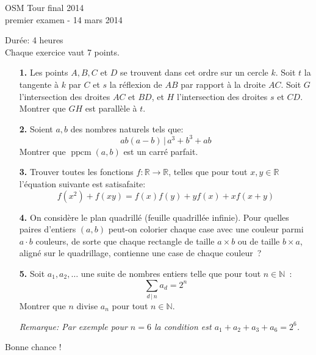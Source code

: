 \documentclass[11pt,a4paper]{article}
\theoremstyle{plain}
\theoremstyle{definition}
\DeclareMathOperator{\ppmc}{ppcm}
\renewcommand{\div}{\, | \,}
\newcommand{\R}{\mathbb{R}}
\newcommand{\N}{\mathbb{N}}
\begin{document}
\pagestyle{empty}

\begin{center}
{\huge OSM Tour final 2014} \\
\medskip premier examen - 14 mars 2014
\end{center}
\vspace{8mm}
Durée: 4 heures\\
Chaque exercice vaut 7 points.

\vspace{15mm}

\begin{enumerate}
\item[\textbf{1.}]
Les points $A, B, C$ et $D$ se trouvent dans cet ordre sur un cercle $k$. Soit $t$ la tangente à $k$ par $C$ et $s$ la réflexion de $AB$ par rapport à la droite $AC$. Soit $G$ l'intersection des droites $AC$ et $BD$, et $H$ l'intersection des droites $s$ et $CD$. Montrer que $GH$ est parallèle à $t$.


\bigskip

\item[\textbf{2.}]
Soient $a,b$ des nombres naturels tels que:
\[ab(a-b)\div a^3+b^3+ab\]
Montrer que $\ppmc(a,b)$ est un carré parfait.


\bigskip

\item[\textbf{3.}] 
Trouver toutes les fonctions $f:\R \rightarrow \R$, telles que pour tout $x,y \in \R$ l'équation suivante est satisafaite:
\[
f(x^2) + f(xy)=f(x)f(y)+yf(x)+xf(x+y)
\]

\bigskip

\item[\textbf{4.}]
On considère le plan quadrillé (feuille quadrillée infinie). Pour quelles paires d'entiers $(a,b)$ peut-on colorier chaque case avec une couleur parmi $a \cdot b$ couleurs, de sorte que chaque rectangle de taille $a \times b$ ou de taille $b \times a$, aligné sur le quadrillage, contienne une case de chaque couleur~?


\bigskip

\item[\textbf{5.}]
Soit $a_1, a_2, \ldots$ une suite de nombres entiers telle que pour tout $n\in\N$~:
 \[
\sum_{d\div n}a_d = 2^n
\]
Montrer que $n$ divise $a_n$ pour tout $n\in\N$.

\emph{Remarque: Par exemple pour $n=6$ la condition est $a_1+a_2+a_3+a_6=2^6$.}
\end{enumerate}
\bigskip
\begin{center}
Bonne chance !
\end{center}
\end{document}
